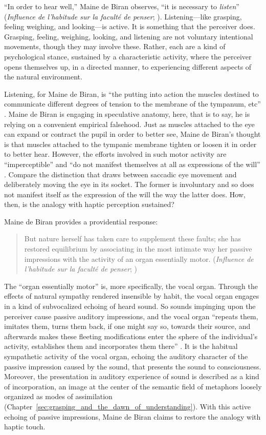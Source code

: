 ``In order to hear well,'' Maine de Biran observes, ``it is necessary to \emph{listen}'' (\emph{Influence de l'habitude sur la faculté de penser}; \citealt[63--4]{Boehm:1929aa}). Listening---like grasping, feeling weighing, and looking---is active. It is something that the perceiver does. Grasping, feeling, weighing, looking, and listening are not voluntary intentional movements, though they may involve these. Rather, each are a kind of psychological stance, sustained by a characteristic activity, where the perceiver opens themselves up, in a directed manner, to experiencing different aspects of the natural environment.

Listening, for Maine de Biran, is ``the putting into action the muscles destined to communicate different degrees of tension to the membrane of the tympanum, etc'' \citep[64]{Boehm:1929aa}. Maine de Biran is engaging in speculative anatomy, here, that is to say, he is relying on a convenient empirical falsehood. Just as muscles attached to the eye can expand or contract the pupil in order to better see, Maine de Biran's thought is that muscles attached to the tympanic membrane tighten or loosen it in order to better hear. However, the efforts involved in such motor activity are ``imperceptible'' and ``do not manifest themselves at all as expressions of the will'' \citep[64]{Boehm:1929aa}. Compare the distinction that \citet[]{Smith:2002sa} draws between saccadic eye movement and deliberately moving the eye in its socket. The former is involuntary and so does not manifest itself as the expression of the will the way the latter does. How, then, is the analogy with haptic perception sustained? 

Maine de Biran provides a providential response:
\begin{quote}
	But nature herself has taken care to supplement these faults; she has restored equilibrium by associating in the most intimate way her passive impressions with the activity of an organ essentially motor. (\emph{Influence de l'habitude sur la faculté de penser}; \citealt[63--4]{Boehm:1929aa})
\end{quote}
The ``organ essentially motor'' is, more specifically, the vocal organ. Through the effects of natural sympathy rendered insensible by habit, the vocal organ engages in a kind of subvocalized echoing of heard sound. So sounds impinging upon the perceiver cause passive auditory impressions, and the vocal organ ``repeats them, imitates them, turns them back, if one might say so, towards their source, and afterwards makes these fleeting modifications enter the sphere of the individual's activity, establishes them and incorporates them there'' \citep[64]{Boehm:1929aa}. It is the habitual sympathetic activity of the vocal organ, echoing the auditory character of the passive impression caused by the sound, that presents the sound to consciousness. Moreover, the presentation in auditory experience of sound is described as a kind of incorporation, an image at the center of the semantic field of metaphors loosely organized as modes of assimilation (Chapter~\ref{sec:grasping_and_the_dawn_of_understanding}). With this active echoing of passive impressions, Maine de Biran claims to restore the analogy with haptic touch.

